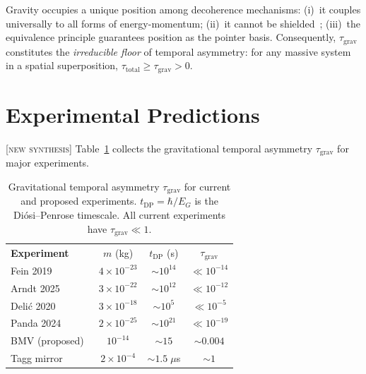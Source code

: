 \documentclass[prl,twocolumn,superscriptaddress,longbibliography,floatfix]{revtex4-2}
\newcommand{\tauasym}{\tau}
\begin{document}
Gravity occupies a unique position among decoherence mechanisms:
(i)~it couples universally to all forms of energy-momentum;
(ii)~it cannot be shielded~\cite{Pikovski2015,Penrose1996};
(iii)~the equivalence principle guarantees position as the pointer
basis.  Consequently, $\tauasym_{\mathrm{grav}}$ constitutes
the \emph{irreducible floor} of temporal asymmetry: for any
massive system in a spatial superposition,
$\tauasym_{\mathrm{total}} \geq \tauasym_{\mathrm{grav}} > 0$.

\section{Experimental Predictions}
\label{sec:experiments}

[\textsc{new synthesis}]  Table~\ref{tab:experiments} collects the
gravitational temporal asymmetry $\tauasym_{\mathrm{grav}}$ for major
experiments.

\begin{table}[htbp]
\caption{\label{tab:experiments}Gravitational temporal asymmetry
$\tauasym_{\mathrm{grav}}$ for current and proposed experiments.
$t_{\mathrm{DP}} = \hbar/E_G$ is the Di\'{o}si--Penrose timescale.
All current experiments have $\tauasym_{\mathrm{grav}} \ll 1$.}
\begin{ruledtabular}
\begin{tabular}{lccc}
\textbf{Experiment} & $m$ (kg) & $t_{\mathrm{DP}}$ (s)
  & $\tauasym_{\mathrm{grav}}$ \\
\colrule
Fein 2019~\cite{Fein2019}        & $4{\times}10^{-23}$ & $\sim 10^{14}$  & $\ll 10^{-14}$ \\
Arndt 2025~\cite{Arndt2025}      & $3{\times}10^{-22}$ & $\sim 10^{12}$  & $\ll 10^{-12}$ \\
Deli\'{c} 2020~\cite{Delic2020}  & $3{\times}10^{-18}$ & $\sim 10^{5}$   & $\ll 10^{-5}$ \\
Panda 2024~\cite{Panda2024}      & $2{\times}10^{-25}$ & $\sim 10^{21}$  & $\ll 10^{-19}$ \\
\colrule
BMV (proposed)~\cite{Bose2017}   & $10^{-14}$          & $\sim 15$       & $\sim 0.004$ \\
Tagg mirror~\cite{Penrose1996}   & $2{\times}10^{-4}$  & $\sim 1.5\;\mu$s & $\sim 1$ \\
\end{tabular}
\end{ruledtabular}
\end{table}
\end{document}

